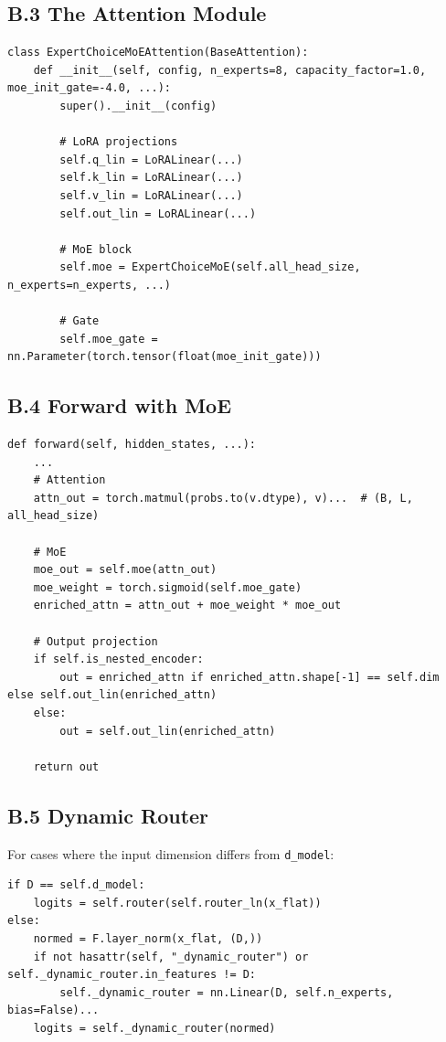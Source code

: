 \subsection{B.3 The Attention Module}

\begin{lstlisting}
class ExpertChoiceMoEAttention(BaseAttention):
    def __init__(self, config, n_experts=8, capacity_factor=1.0, moe_init_gate=-4.0, ...):
        super().__init__(config)
        
        # LoRA projections
        self.q_lin = LoRALinear(...)
        self.k_lin = LoRALinear(...)
        self.v_lin = LoRALinear(...)
        self.out_lin = LoRALinear(...)
        
        # MoE block
        self.moe = ExpertChoiceMoE(self.all_head_size, n_experts=n_experts, ...)
        
        # Gate
        self.moe_gate = nn.Parameter(torch.tensor(float(moe_init_gate)))
\end{lstlisting}

\subsection{B.4 Forward with MoE}

\begin{lstlisting}
def forward(self, hidden_states, ...):
    ...
    # Attention
    attn_out = torch.matmul(probs.to(v.dtype), v)...  # (B, L, all_head_size)
    
    # MoE
    moe_out = self.moe(attn_out)
    moe_weight = torch.sigmoid(self.moe_gate)
    enriched_attn = attn_out + moe_weight * moe_out
    
    # Output projection
    if self.is_nested_encoder:
        out = enriched_attn if enriched_attn.shape[-1] == self.dim else self.out_lin(enriched_attn)
    else:
        out = self.out_lin(enriched_attn)
    
    return out
\end{lstlisting}

\subsection{B.5 Dynamic Router}

For cases where the input dimension differs from \texttt{d\_model}:

\begin{lstlisting}
if D == self.d_model:
    logits = self.router(self.router_ln(x_flat))
else:
    normed = F.layer_norm(x_flat, (D,))
    if not hasattr(self, "_dynamic_router") or self._dynamic_router.in_features != D:
        self._dynamic_router = nn.Linear(D, self.n_experts, bias=False)...
    logits = self._dynamic_router(normed)
\end{lstlisting}

